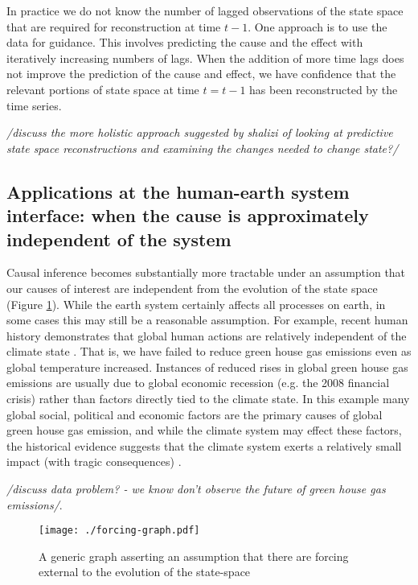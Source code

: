 \documentclass[12pt]{article}
\begin{document}
In practice we do not know the number of lagged observations of the
state space that are required for reconstruction at time $t-1$. One
approach is to use the data for guidance. This involves predicting the
cause and the effect with iteratively increasing numbers of lags. When
the addition of more time lags does not improve the prediction of the
cause and effect, we have confidence that the relevant portions of
state space at time $t=t-1$ has been reconstructed by the time series.

\textit{/discuss the more holistic approach suggested by shalizi of
  looking at predictive state space reconstructions and examining the
  changes needed to change state?/}

\subsection{Applications at the human-earth system interface: when the
  cause is approximately independent of the system}
\label{human}

Causal inference becomes substantially more tractable under an
assumption that our causes of interest are independent from the
evolution of the state space (Figure \ref{fig:forcing}). While the
earth system certainly affects all processes on earth, in some cases
this may still be a reasonable assumption. For example, recent human
history demonstrates that global human actions are relatively
independent of the climate state \citep{arto2014drivers}. That is, we
have failed to reduce green house gas emissions even as global
temperature increased. Instances of reduced rises in global green
house gas emissions are usually due to global economic recession
(e.g. the 2008 financial crisis) rather than factors directly tied to
the climate state. In this example many global social, political and
economic factors are the primary causes of global green house gas
emission, and while the climate system may effect these factors, the
historical evidence suggests that the climate system exerts a
relatively small impact (with tragic consequences)
\citep{arto2014drivers}.

\emph{/discuss data problem? - we know
  don't observe the future of green house gas emissions/}.

\begin{figure}
  \texttt{[image: ./forcing-graph.pdf]}
  \caption{A generic graph asserting an assumption that there are
    forcing external to the evolution of the state-space}
  \label{fig:forcing}
\end{figure}
\end{document}
